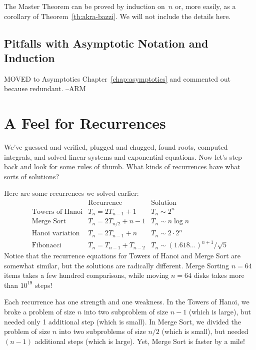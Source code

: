 The Master Theorem can be proved by induction on~$n$ or, more easily,
as a corollary of Theorem~\ref{th:akra-bazzi}.  We will not include
the details here.

\begin{editingnotes}
\subsection*{Pitfalls with Asymptotic Notation and Induction}
MOVED to Asymptotics Chapter~\ref{chap:asymptotics} and commented out
because redundant. --ARM
\end{editingnotes}

\begin{problems}
\homeworkproblems
{}

\classproblems
{}

\examproblems
{}

\end{problems}

\section{A Feel for Recurrences}

We've guessed and verified, plugged and chugged, found roots, computed
integrals, and solved linear systems and exponential equations.  Now
let's step back and look for some rules of thumb.  What kinds of
recurrences have what sorts of solutions?

Here are some recurrences we solved earlier:
\[
\begin{array}{lll}
& \text{Recurrence} & \text{Solution} \\
\text{Towers of Hanoi} & T_n = 2 T_{n-1} + 1 & T_n \sim 2^n \\
\text{Merge Sort} & T_n = 2 T_{n/2} + n - 1 & T_n \sim n \log n \\
\text{Hanoi variation} & T_n = 2 T_{n-1} + n & T_n \sim 2 \cdot 2^n \\
\text{Fibonacci} & T_n = T_{n-1} + T_{n-2} & T_n \sim
(1.618\dots)^{n+1} / \sqrt{5}
\end{array}
\]
Notice that the recurrence equations for Towers of Hanoi and Merge
Sort are somewhat similar, but the solutions are radically different.
Merge Sorting $n = 64$ items takes a few hundred comparisons, while
moving $n = 64$ disks takes more than $10^{19}$ steps!

Each recurrence has one strength and one weakness.  In the Towers of
Hanoi, we broke a problem of size $n$ into two subproblem of size $n -
1$ (which is large), but needed only 1 additional step (which is
small).  In Merge Sort, we divided the problem of size $n$ into two
subproblems of size $n/2$ (which is small), but needed $(n - 1)$
additional steps (which is large).  Yet, Merge Sort is faster by a
mile!

